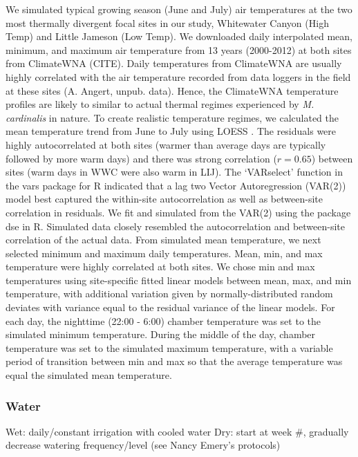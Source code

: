 \documentclass[11pt, oneside]{article}
\begin{document}
We simulated typical growing season (June and July) air temperatures at the two most thermally divergent focal sites in our study, Whitewater Canyon (High Temp) and Little Jameson (Low Temp). We downloaded daily interpolated mean, minimum, and maximum air temperature from 13 years (2000-2012) at both sites from ClimateWNA (CITE). Daily temperatures from ClimateWNA are usually highly correlated with the air temperature recorded from data loggers in the field at these sites (A. Angert, unpub. data). Hence, the ClimateWNA temperature profiles are likely to similar to actual thermal regimes experienced by \textit{M. cardinalis} in nature. To create realistic temperature regimes, we calculated the mean temperature trend from June to July using LOESS \citep{Cleveland_etal_1992}. The residuals were highly autocorrelated at both sites (warmer than average days are typically followed by more warm days) and there was strong correlation ($r = 0.65$) between sites (warm days in WWC were also warm in LIJ). The `VARselect' function in the vars package for R \citep{Pfaff_2008} indicated that a lag two Vector Autoregression (VAR(2)) model best captured the within-site autocorrelation as well as between-site correlation in residuals. We fit and simulated from the VAR(2) using the package dse \citep{Gilbert_2006?} in R. Simulated data closely resembled the autocorrelation and between-site correlation of the actual data. From simulated mean temperature, we next selected minimum and maximum daily temperatures. Mean, min, and max temperature were highly correlated at both sites. We chose min and max temperatures using site-specific fitted linear models between mean, max, and min temperature, with additional variation given by normally-distributed random deviates with variance equal to the residual variance of the linear models. For each day, the nighttime (22:00 - 6:00) chamber temperature was set to the simulated minimum temperature. During the middle of the day, chamber temperature was set to the simulated maximum temperature, with a variable period of transition between min and max so that the average temperature was equal the simulated mean temperature.

\subsubsection*{Water}

			Wet: daily/constant irrigation with cooled water
			Dry: start at week \#, gradually decrease watering frequency/level (see Nancy Emery's protocols)
\end{document}
